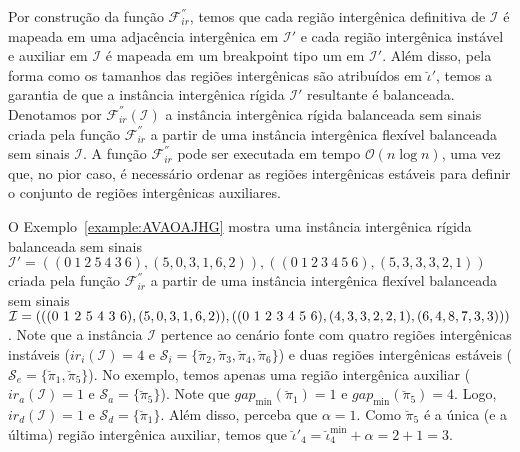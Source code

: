 Por construção da função $\mathcal{F}_{ir}^{''}$, temos que cada região intergênica definitiva de $\mathcal{I}$ é mapeada em uma adjacência intergênica em $\mathcal{I}'$ e cada região intergênica instável e auxiliar em $\mathcal{I}$ é mapeada em um breakpoint tipo um em $\mathcal{I}'$. Além disso, pela forma como os tamanhos das regiões intergênicas são atribuídos em $\breve\iota'$, temos a garantia de que a instância intergênica rígida $\mathcal{I}'$ resultante é balanceada. Denotamos por $\mathcal{F}_{ir}^{''}(\mathcal{I})$ a instância intergênica rígida balanceada sem sinais criada pela função $\mathcal{F}_{ir}^{''}$ a partir de uma instância intergênica flexível balanceada sem sinais $\mathcal{I}$. A função $\mathcal{F}_{ir}^{''}$ pode ser executada em tempo $\mathcal{O}(n\log n)$, uma vez que, no pior caso, é necessário ordenar as regiões intergênicas estáveis para definir o conjunto de regiões intergênicas auxiliares. 

\pagebreak

O Exemplo~\ref{example:AVAOAJHG} mostra uma instância intergênica rígida balanceada sem sinais $\mathcal{I}' = ((0~1~2~5~4~3~6),(5,0,3,1,6,2)),((0~1~2~3~4~5~6),(5,3,3,3,2,1))$ criada pela função $\mathcal{F}_{ir}^{''}$ a partir de uma instância intergênica flexível balanceada sem sinais $\mathcal{I} = (((0~1~2~5~4~3~6),(5,0,3,\break1,6,2)),((0~1~2~3~4~5~6),(4,3,3,2,2,1),(6,4,8,7,3,3)))$. Note que a instância $\mathcal{I}$ pertence ao cenário fonte com quatro regiões intergênicas instáveis ($ir_i(\mathcal{I}) = 4$ e $\mathcal{S}_{i}=\{\breve\pi_2,\breve\pi_3,\breve\pi_4,\breve\pi_6\}$) e duas regiões intergênicas estáveis ($\mathcal{S}_{e}=\{\breve\pi_1,\breve\pi_5\}$). No exemplo, temos apenas uma região intergênica auxiliar ($ir_a(\mathcal{I}) = 1$ e $\mathcal{S}_{a}=\{\breve\pi_5\}$). Note que $gap_{\min}(\breve\pi_1) = 1$ e $gap_{\min}(\breve\pi_5) = 4$. Logo, $ir_d(\mathcal{I}) = 1$ e $\mathcal{S}_{d}=\{\breve\pi_1\}$. Além disso, perceba que $\alpha = 1$. Como $\breve\pi_5$ é a única (e a última) região intergênica auxiliar, temos que $\breve\iota'_4 = \breve\iota^{\min}_4 +\alpha = 2 + 1 = 3$.



\pagebreak


